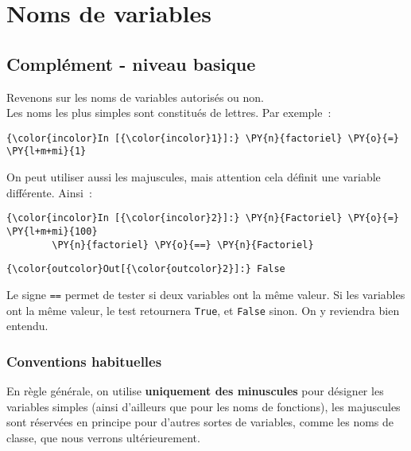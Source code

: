     \hypertarget{noms-de-variables}{%
\section{Noms de variables}\label{noms-de-variables}}

    \hypertarget{compluxe9ment---niveau-basique}{%
\subsection{Complément - niveau
basique}\label{compluxe9ment---niveau-basique}}

    Revenons sur les noms de variables autorisés ou non.\\

    Les noms les plus simples sont constitués de lettres. Par exemple~:

    \begin{Verbatim}[commandchars=\\\{\}]
{\color{incolor}In [{\color{incolor}1}]:} \PY{n}{factoriel} \PY{o}{=} \PY{l+m+mi}{1}
\end{Verbatim}


    On peut utiliser aussi les majuscules, mais attention cela définit une
variable différente. Ainsi~:

    \begin{Verbatim}[commandchars=\\\{\}]
{\color{incolor}In [{\color{incolor}2}]:} \PY{n}{Factoriel} \PY{o}{=} \PY{l+m+mi}{100}
        \PY{n}{factoriel} \PY{o}{==} \PY{n}{Factoriel}
\end{Verbatim}


\begin{Verbatim}[commandchars=\\\{\}]
{\color{outcolor}Out[{\color{outcolor}2}]:} False
\end{Verbatim}
            
    Le signe \texttt{==} permet de tester si deux variables ont la même
valeur. Si les variables ont la même valeur, le test retournera
\texttt{True}, et \texttt{False} sinon. On y reviendra bien entendu.

    \hypertarget{conventions-habituelles}{%
\subsubsection{Conventions habituelles}\label{conventions-habituelles}}

    En règle générale, on utilise \textbf{uniquement des minuscules} pour
désigner les variables simples (ainsi d'ailleurs que pour les noms de
fonctions), les majuscules sont réservées en principe pour d'autres
sortes de variables, comme les noms de classe, que nous verrons
ultérieurement.\\

